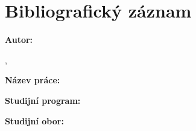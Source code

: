 {  \section*{Bibliografický záznam}
  \noindent
  \begin{minipage}[t]{0.25\textwidth}\vspace{0pt}%
    \doccol \textbf{Autor:}
  \end{minipage}
  \hspace{0.05\textwidth}
  \begin{minipage}[t]{0.7\textwidth}\vspace{0pt}%
    \@Author, \par
    \@AuthorAffCZE
  \end{minipage} \par
  \vspace{0.5cm}
  \noindent
  \begin{minipage}[t]{0.25\textwidth}\vspace{0pt}%
    \doccol \textbf{Název práce:}
  \end{minipage}
  \hspace{0.05\textwidth}
  \begin{minipage}[t]{0.7\textwidth}\vspace{0pt}%
    \textbf{\@TitleCZE}
  \end{minipage} \par
  \vspace{0.5cm}
  \noindent
  \begin{minipage}[t]{0.25\textwidth}\vspace{0pt}%
    \doccol \textbf{Studijní program:}
  \end{minipage}
  \hspace{0.05\textwidth}
  \begin{minipage}[t]{0.7\textwidth}\vspace{0pt}%
    \@DegreeProgrammeCZE
  \end{minipage} \par
  \vspace{0.5cm}
  \noindent
  \begin{minipage}[t]{0.25\textwidth}\vspace{0pt}%
    \doccol \textbf{Studijní obor:}
  \end{minipage}
  \hspace{0.05\textwidth}
  \begin{minipage}[t]{0.7\textwidth}\vspace{0pt}%
    \@FieldCZE
  \end{minipage} \par
}
